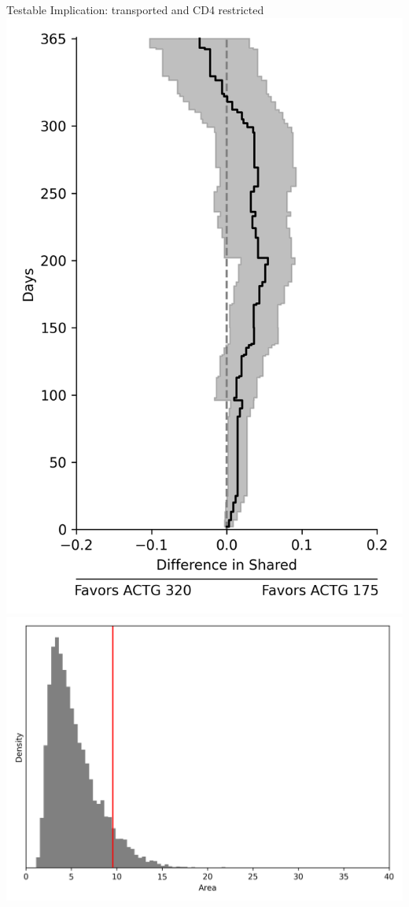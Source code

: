 \documentclass{beamer}
\begin{document}
\begin{frame}{Testable Implication: transported and CD4 restricted}
	\centering
	\includegraphics[scale=0.33]{images/diagnostic_graph_rtrn.png}	
	\includegraphics[scale=0.4]{images/diagnostic_test_rtrn.png}	
\end{frame}
\end{document}
